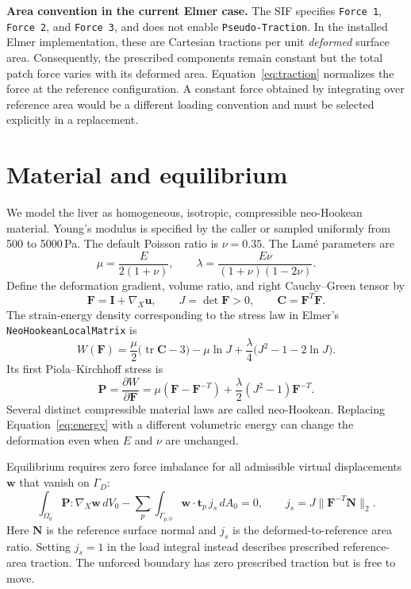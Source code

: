 \documentclass[11pt]{article}
\newcommand{\vect}[1]{\boldsymbol{#1}}
\begin{document}
\textbf{Area convention in the current Elmer case.}
The SIF specifies \texttt{Force 1}, \texttt{Force 2}, and \texttt{Force 3}, and
does not enable \texttt{Pseudo-Traction}. In the installed Elmer implementation,
these are Cartesian tractions per unit \emph{deformed} surface area. Consequently,
the prescribed components remain constant but the total patch force varies with
its deformed area. Equation~\eqref{eq:traction} normalizes the force at the reference
configuration. A constant force obtained by integrating over reference area would
be a different loading convention and must be selected explicitly in a replacement.

\section{Material and equilibrium}
We model the liver as homogeneous, isotropic, compressible neo-Hookean material.
Young's modulus is specified by the caller or sampled uniformly from 500 to
5000\,Pa. The default Poisson ratio is $\nu=0.35$.
The Lam\'e parameters are
\begin{equation}
 \mu=\frac{E}{2(1+\nu)},\qquad
 \lambda=\frac{E\nu}{(1+\nu)(1-2\nu)}.
\end{equation}
Define the deformation gradient, volume ratio, and right Cauchy--Green tensor by
\begin{equation}
 \vect{F}=\vect{I}+\nabla_X\vect{u},\qquad
 J=\det\vect{F}>0,\qquad \vect{C}=\vect{F}^{T}\vect{F}.
\end{equation}
The strain-energy density corresponding to the stress law in Elmer's
\texttt{NeoHookeanLocalMatrix} is
\begin{equation}
 W(\vect{F})=
 \frac{\mu}{2}\bigl(\operatorname{tr}\vect{C}-3\bigr)-\mu\ln J
 +\frac{\lambda}{4}\bigl(J^2-1-2\ln J\bigr).
 \label{eq:energy}
\end{equation}
Its first Piola--Kirchhoff stress is
\begin{equation}
 \vect{P}=\frac{\partial W}{\partial\vect{F}}
 =\mu(\vect{F}-\vect{F}^{-T})
   +\frac{\lambda}{2}(J^2-1)\vect{F}^{-T}.
\end{equation}
Several distinct compressible material laws are called neo-Hookean. Replacing
Equation~\eqref{eq:energy} with a different volumetric energy can change the
deformation even when $E$ and $\nu$ are unchanged.

Equilibrium requires zero force imbalance for all admissible virtual
displacements $\vect{w}$ that vanish on $\Gamma_D$:
\begin{equation}
 \int_{\Omega_0}\vect{P}:\nabla_X\vect{w}\,dV_0
 -\sum_p\int_{\Gamma_{p,0}}\vect{w}\cdot\vect{t}_p\,j_s\,dA_0=0,
 \qquad
 j_s=J\|\vect{F}^{-T}\vect{N}\|_2.
 \label{eq:weak}
\end{equation}
Here $\vect{N}$ is the reference surface normal and $j_s$ is the deformed-to-reference
area ratio. Setting $j_s=1$ in the load integral instead describes prescribed
reference-area traction. The unforced boundary has zero prescribed traction but
is free to move.
\end{document}
